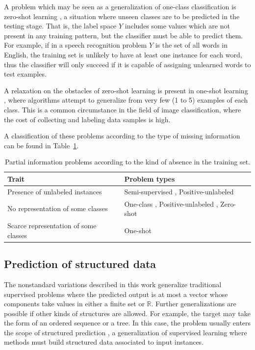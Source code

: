 A problem which may be seen as a generalization of one-class classification is zero-shot learning , a situation where unseen classes are to be predicted in the testing stage. That is, the label space $Y$ includes some values which are not present in any training pattern, but the classifier must be able to predict them. For example, if in a speech recognition problem $Y$ is the set of all words in English, the training set is unlikely to have at least one instance for each word, thus the classifier will only succeed if it is capable of assigning unlearned words to test examples.

A relaxation on the obstacles of zero-shot learning is present in one-shot learning , where algorithms attempt to generalize from very few (1 to 5) examples of each class. This is a common circumstance in the field of image classification, where the cost of collecting and labeling data samples is high.

A classification of these problems according to the type of missing information can be found in Table~\ref{p3tbl.partial-problems}.

\begin{table}[ht]
\centering
\renewcommand{\arraystretch}{1.4}
\begin{tabular}{l  l}
\toprule
\textbf{Trait} & \textbf{Problem types} \\ \hline
Presence of unlabeled instances & Semi-supervised \cite{semi-sup}, Positive-unlabeled \cite{pu-learn} \\
No representation of some classes &   One-class \cite{oneclass}, Positive-unlabeled \cite{pu-learn}, Zero-shot \cite{zeroshot} \\
Scarce representation of some classes &  One-shot \cite{oneshot}\\
\toprule
\end{tabular}
\caption{\label{p3tbl.partial-problems}Partial information problems according to the kind of absence in the training set.}
\end{table}

\subsection{Prediction of structured data}

The nonstandard variations described in this work generalize traditional supervised problems where the predicted output is at most a vector whose components take values in either a finite set or $\mathbb R$. Further generalizations are possible if other kinds of structures are allowed. For example, the target may take the form of an ordered sequence or a tree. In this case, the problem usually enters the scope of structured prediction , a generalization of supervised learning where methods must build structured data associated to input instances.

